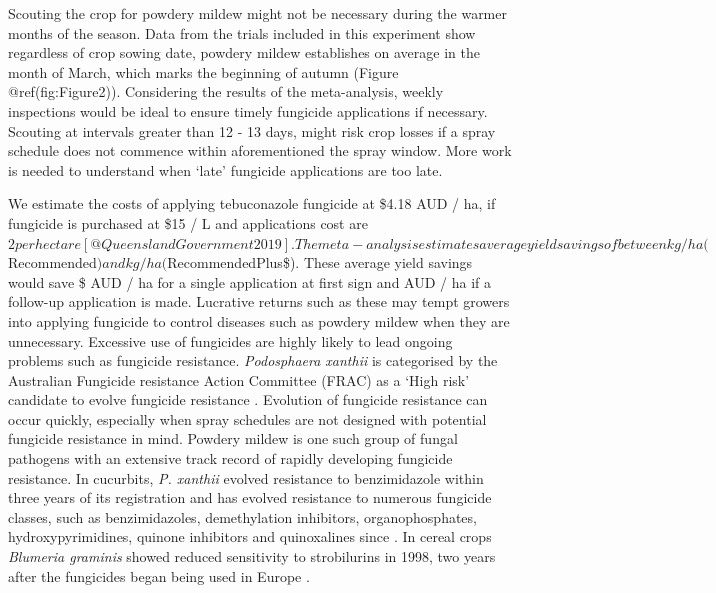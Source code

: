 \documentclass[agronomy,article,submit,moreauthors,pdftex]{mdpi}
\begin{document}
Scouting the crop for powdery mildew might not be necessary during the
warmer months of the season. Data from the trials included in this
experiment show regardless of crop sowing date, powdery mildew
establishes on average in the month of March, which marks the beginning
of autumn (Figure @ref(fig:Figure2)). Considering the results of the
meta-analysis, weekly inspections would be ideal to ensure timely
fungicide applications if necessary. Scouting at intervals greater than
12 - 13 days, might risk crop losses if a spray schedule does not
commence within aforementioned the spray window. More work is needed to
understand when `late' fungicide applications are too late.

We estimate the costs of applying tebuconazole fungicide at \$4.18 AUD /
ha, if fungicide is purchased at \$15 / L \citep{Simfendorfer2011} and
applications cost are
\(2 per hectare [@QueenslandGovernment2019]. The meta-analysis estimates average yield savings of between kg / ha (\)Recommended\() and kg / ha (\)RecommendedPlus\$).
These average yield savings would save \$ AUD / ha for a single
application at first sign and AUD / ha if a follow-up application is
made. Lucrative returns such as these may tempt growers into applying
fungicide to control diseases such as powdery mildew when they are
unnecessary. Excessive use of fungicides are highly likely to lead
ongoing problems such as fungicide resistance. \emph{Podosphaera
xanthii} is categorised by the Australian Fungicide resistance Action
Committee (FRAC) as a `High risk' candidate to evolve fungicide
resistance \citep{FRACrisk2019}. Evolution of fungicide resistance can
occur quickly, especially when spray schedules are not designed with
potential fungicide resistance in mind. Powdery mildew is one such group
of fungal pathogens with an extensive track record of rapidly developing
fungicide resistance. In cucurbits, \emph{P. xanthii} evolved resistance
to benzimidazole within three years of its registration
\citep{Peterson1973} and has evolved resistance to numerous fungicide
classes, such as benzimidazoles, demethylation inhibitors,
organophosphates, hydroxypyrimidines, quinone inhibitors and
quinoxalines since \citep{Mcgrath2001}. In cereal crops \emph{Blumeria
graminis} showed reduced sensitivity to strobilurins in 1998, two years
after the fungicides began being used in Europe \citep{Chin2001}.
\end{document}
